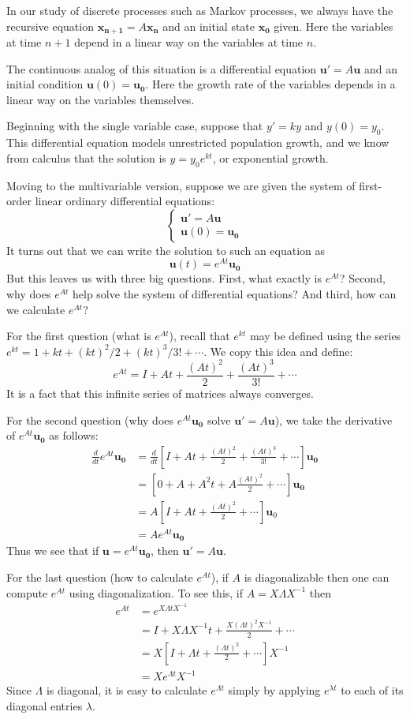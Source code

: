 \documentclass[11pt,oneside]{amsbook}
\theoremstyle{definition}
\theoremstyle{plain}
\theoremstyle{definition}
\theoremstyle{remark}
\numberwithin{equation}{section}
\numberwithin{figure}{section}
\begin{document}
In our study of discrete processes such as Markov processes, we always have the recursive equation $\bm{x_{n+1}}=A\bm{x_n}$ and an initial state $\bm{x_0}$ given. Here the variables at time $n+1$ depend in a linear way on the variables at time $n$.

The continuous analog of this situation is a differential equation $\bm{u}'=A\bm{u}$ and an initial condition $\bm{u}(0)=\bm{u_0}$. Here the growth rate of the variables depends in a linear way on the variables themselves.

Beginning with the single variable case, suppose that $y'=ky$ and $y(0)=y_0$. This differential equation models unrestricted population growth, and we know from calculus that the solution is $y=y_0e^{kt}$, or exponential growth.

Moving to the multivariable version, suppose we are given the system of first-order linear ordinary differential equations:
\[\begin{cases}
    \bm{u}'=A\bm{u}\\
    \bm{u}(0)=\bm{u_0}
  \end{cases}
\]
It turns out that we can write the solution to such an equation as
\[\bm{u}(t)=e^{At}\bm{u_0}
\]
But this leaves us with three big questions. First, what exactly is $e^{At}$? Second, why does $e^{At}$ help solve the system of differential equations? And third, how can we calculate $e^{At}$?

For the first question (what is $e^{At}$), recall that $e^{kt}$ may be defined using the series $e^{kt}=1+kt+(kt)^2/2+(kt)^3/3!+\cdots$. We copy this idea and define:
\[e^{At}=I+At+\frac{(At)^2}{2}+\frac{(At)^3}{3!}+\cdots
\]
It is a fact that this infinite series of matrices always converges.

For the second question (why does $e^{At}\bm{u_0}$ solve $\bm{u}'=A\bm{u}$), we take the derivative of $e^{At}\bm{u_0}$ as follows:
\begin{align*}
  \frac{d}{dt}e^{At}\bm{u_0}
  &=\frac{d}{dt}\left[
    I+At+\frac{(At)^2}{2}+\frac{(At)^3}{3!}+\cdots
    \right]\bm{u_0}\\
  &=\left[0+A+A^2t+A\frac{(At)^2}{2}+\cdots\right]
    \bm{u_0}\\
  &=A\left[I+At+\frac{(At)^2}{2}+\cdots\right]\bm{u}_0\\
  &=Ae^{At}\bm{u_0}
\end{align*}
Thus we see that if $\bm{u}=e^{At}\bm{u_0}$, then $\bm{u}'=A\bm{u}$.

For the last question (how to calculate $e^{At}$), if $A$ is diagonalizable then one can compute $e^{At}$ using diagonalization. To see this, if $A=X\Lambda X^{-1}$ then
\begin{align*}
  e^{At}&=e^{X\Lambda t X^{-1}}\\
        &=I+X\Lambda X^{-1}t+\frac{X(\Lambda t)^2X^{-1}}{2}+\cdots\\
        &=X\left[I+\Lambda t+\frac{(\Lambda t)^2}{2}+\cdots\right]X^{-1}\\
        &=Xe^{\Lambda t}X^{-1}
\end{align*}
Since $\Lambda$ is diagonal, it is easy to calculate $e^{\Lambda t}$ simply by applying $e^{\lambda t}$ to each of its diagonal entries $\lambda$.
\end{document}
